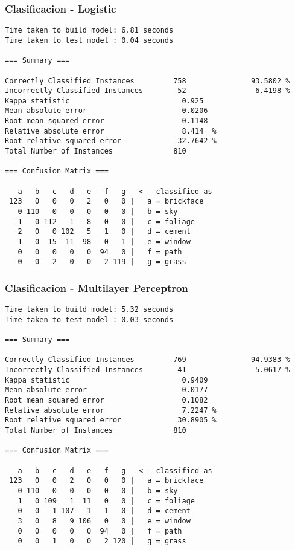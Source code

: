 \documentclass[a4paper]{article}
\begin{document}
\subsubsection{Clasificacion - Logistic}
\begin{verbatim}
Time taken to build model: 6.81 seconds
Time taken to test model : 0.04 seconds

=== Summary ===

Correctly Classified Instances         758               93.5802 %
Incorrectly Classified Instances        52                6.4198 %
Kappa statistic                          0.925
Mean absolute error                      0.0206
Root mean squared error                  0.1148
Relative absolute error                  8.414  %
Root relative squared error             32.7642 %
Total Number of Instances              810

=== Confusion Matrix ===

   a   b   c   d   e   f   g   <-- classified as
 123   0   0   0   2   0   0 |   a = brickface
   0 110   0   0   0   0   0 |   b = sky
   1   0 112   1   8   0   0 |   c = foliage
   2   0   0 102   5   1   0 |   d = cement
   1   0  15  11  98   0   1 |   e = window
   0   0   0   0   0  94   0 |   f = path
   0   0   2   0   0   2 119 |   g = grass

\end{verbatim}

\subsubsection{Clasificacion - Multilayer Perceptron}
\begin{verbatim}
Time taken to build model: 5.32 seconds
Time taken to test model : 0.03 seconds

=== Summary ===

Correctly Classified Instances         769               94.9383 %
Incorrectly Classified Instances        41                5.0617 %
Kappa statistic                          0.9409
Mean absolute error                      0.0177
Root mean squared error                  0.1082
Relative absolute error                  7.2247 %
Root relative squared error             30.8905 %
Total Number of Instances              810

=== Confusion Matrix ===

   a   b   c   d   e   f   g   <-- classified as
 123   0   0   2   0   0   0 |   a = brickface
   0 110   0   0   0   0   0 |   b = sky
   1   0 109   1  11   0   0 |   c = foliage
   0   0   1 107   1   1   0 |   d = cement
   3   0   8   9 106   0   0 |   e = window
   0   0   0   0   0  94   0 |   f = path
   0   0   1   0   0   2 120 |   g = grass


\end{verbatim}
\end{document}

